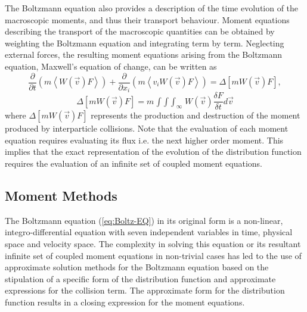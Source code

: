 \documentclass[titlepage,11pt,letterpaper]{article}
\begin{document}
The Boltzmann equation also provides a description of the time evolution of the macroscopic 
moments, and thus their transport behaviour. Moment equations describing the transport of 
the macroscopic quantities can be obtained by weighting the Boltzmann equation and 
integrating term by term. Neglecting external forces, the resulting moment equations arising from the 
Boltzmann equation, Maxwell's equation of change, can be written as
%
\begin{equation}\label{eq:Max-Change}
  \frac{\partial}{\partial t}(m\left<W(\vec{v})F\right>) + \frac{\partial}{\partial x_i}(m\left<v_iW(\vec{v})F\right>) 
  = \Delta \left[mW(\vec{v})F\right], 
\end{equation}
%
\begin{equation}\label{eq:mmt-collision}
  \Delta\left[mW(\vec{v})F\right]=m\mathop{\int\!\!\int\!\!\int}_{\infty}W(\vec{v})\frac{\delta F}{\delta t} d \vec v
\end{equation}
%
where $\Delta \left[mW(\vec{v})F\right]$ represents the production and destruction of the 
moment produced by interparticle collisions. Note that the evaluation of each moment 
equation requires evaluating its flux i.e. the next higher order moment. This implies that the 
exact representation of the evolution of the distribution function requires the evaluation 
of an infinite set of coupled moment equations. 

\subsection{Moment Methods}
The Boltzmann equation (\ref{eq:Boltz-EQ}) in its original form is a non-linear, 
integro-differential equation with seven independent variables in time, physical space and 
velocity space. The complexity in solving this equation or its resultant infinite set of 
coupled moment equations in non-trivial cases has led to the use of approximate solution 
methods for the Boltzmann equation based on the stipulation of a specific form of the 
distribution function and approximate expressions for the collision term. The approximate 
form for the distribution function results in a closing expression for the moment equations.
\end{document}
